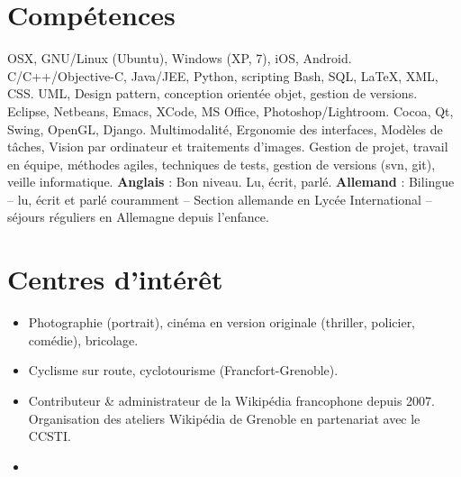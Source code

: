 \documentclass[11pt,a4paper]{moderncv}
\begin{document}
\section{Compétences}
 {OSX, GNU/Linux (Ubuntu), Windows (XP, 7), iOS, Android.}
 {C/C++/Objective-C, Java/JEE, Python, scripting Bash, SQL, LaTeX, XML, CSS.}
 {UML, Design pattern, conception orientée objet, gestion de versions.}
 {Eclipse, Netbeans, Emacs, XCode, MS Office, Photoshop/Lightroom.}
 {Cocoa, Qt, Swing, OpenGL, Django.}
 {Multimodalité, Ergonomie des interfaces, Modèles de tâches, Vision par ordinateur et traitements d'images.}
 {Gestion de projet, travail en équipe, méthodes agiles, techniques de tests, gestion de versions (svn, git), veille informatique.}
 {\textbf{Anglais} : Bon niveau. Lu, écrit, parlé.\newline{}%
\textbf{Allemand} : Bilingue – lu, écrit et parlé couramment – Section allemande en Lycée International – séjours réguliers en Allemagne depuis l'enfance.}


\section{Centres d'intérêt}
\begin{itemize}
\item {Photographie (portrait), cinéma en version originale (thriller, policier, comédie), bricolage.}
\item {Cyclisme sur route, cyclotourisme (Francfort-Grenoble).}
\item {Contributeur \& administrateur de la Wikipédia francophone depuis 2007. Organisation des ateliers Wikipédia de Grenoble en partenariat avec le CCSTI.}
\item {}
\end{itemize}
\end{document}
